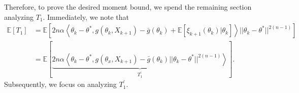\documentclass[a4paper]{article}
\begin{document}
Therefore, to prove the desired moment bound, we spend the remaining section analyzing $T_{1}$. Immediately, we note that
\begin{equation*}
	\begin{split}
		\mathbb{E}\left[T_{1}\right] &= \mathbb{E}\left[2n\alpha \left\langle \theta_{k} - \theta^{*}, g\left(\theta_{k}, X_{k + 1}\right) - \bar{g}\left(\theta_{k}\right) + \mathbb{E}\left[\xi_{k + 1}\left(\theta_{k}\right) | \theta_{k}\right] \right\rangle||\theta_{k} - \theta^{*}||^{2(n - 1)}\right]\\
		& = \mathbb{E}\left[\underbrace{2n\alpha \left\langle \theta_{k} - \theta^{*}, g\left(\theta_{x}, X_{k + 1}\right) - \bar{g}\left(\theta_{k}\right)||\theta_{k} - \theta^{*}||^{2(n - 1)}\right\rangle}_{T_{1}^{\prime}}\right].
	\end{split}
\end{equation*}
Subsequently, we focus on analyzing $T_{1}^{\prime}$.



\end{document}
